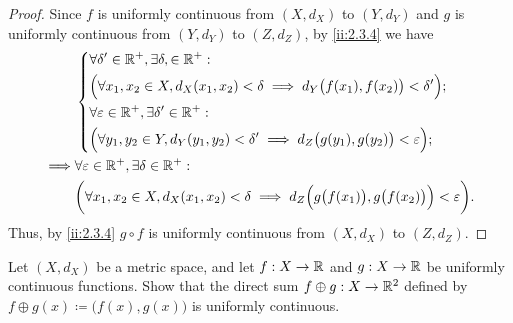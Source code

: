 \begin{proof}
  Since \(f\) is uniformly continuous from \((X, d_X)\) to \((Y, d_Y)\) and \(g\) is uniformly continuous from \((Y, d_Y)\) to \((Z, d_Z)\), by \cref{ii:2.3.4} we have
  \begin{align*}
             & \begin{dcases}
                 \forall \delta' \in \mathbb{R}^+, \exists \delta, \in \mathbb{R}^+ :                                                     \\
                 \Big(\forall x_1, x_2 \in X, d_X(x_1, x_2) < \delta \implies d_Y\big(f(x_1), f(x_2)\big) < \delta'\Big); \\
                 \forall \varepsilon \in \mathbb{R}^+, \exists \delta' \in \mathbb{R}^+ :                                                 \\
                 \Big(\forall y_1, y_2 \in Y, d_Y(y_1, y_2) < \delta' \implies d_Z\big(g(y_1), g(y_2)\big) < \varepsilon\Big);
               \end{dcases}                         \\
    \implies & \forall \varepsilon \in \mathbb{R}^+, \exists \delta \in \mathbb{R}^+ :                                                                              \\
             & \bigg(\forall x_1, x_2 \in X, d_X(x_1, x_2) < \delta \implies d_Z\Big(g\big(f(x_1)\big), g\big(f(x_2)\big)\Big) < \varepsilon\bigg).
  \end{align*}
  Thus, by \cref{ii:2.3.4} \(g \circ f\) is uniformly continuous from \((X, d_X)\) to \((Z, d_Z)\).
\end{proof}

\begin{ex}\label{ii:ex:2.3.5}
  Let \((X, d_X)\) be a metric space, and let \(f : X \to \mathbb{R}\) and \(g : X \to \mathbb{R}\) be uniformly continuous functions.
  Show that the direct sum \(f \oplus g : X \to \mathbb{R}^2\) defined by \(f \oplus g(x) \coloneqq \big(f(x), g(x)\big)\) is uniformly continuous.
\end{ex}


